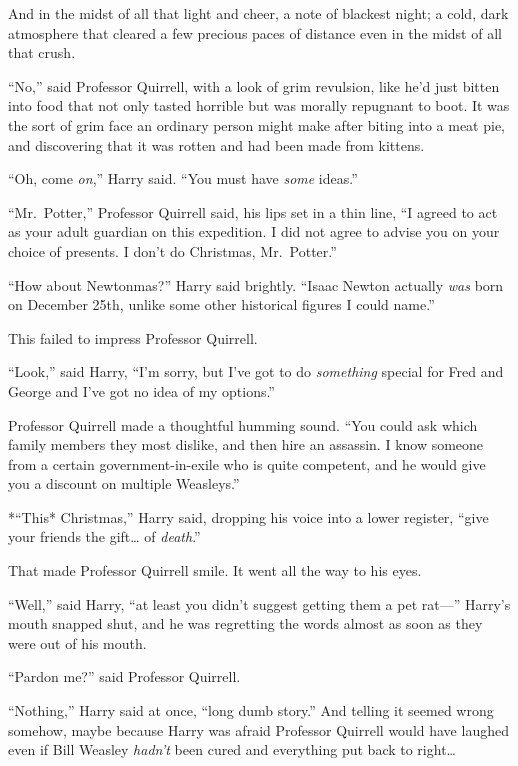 And in the midst of all that light and cheer, a note of blackest night;
a cold, dark atmosphere that cleared a few precious paces of distance
even in the midst of all that crush.

``No,'' said Professor Quirrell, with a look of grim revulsion, like
he'd just bitten into food that not only tasted horrible but was morally
repugnant to boot. It was the sort of grim face an ordinary person might
make after biting into a meat pie, and discovering that it was rotten
and had been made from kittens.

``Oh, come \emph{on},'' Harry said. ``You must have \emph{some} ideas.''

``Mr.~Potter,'' Professor Quirrell said, his lips set in a thin line,
``I agreed to act as your adult guardian on this expedition. I did not
agree to advise you on your choice of presents. I don't do Christmas,
Mr.~Potter.''

``How about Newtonmas?'' Harry said brightly. ``Isaac Newton actually
\emph{was} born on December 25th, unlike some other historical figures I
could name.''

This failed to impress Professor Quirrell.

``Look,'' said Harry, ``I'm sorry, but I've got to do \emph{something}
special for Fred and George and I've got no idea of my options.''

Professor Quirrell made a thoughtful humming sound. ``You could ask
which family members they most dislike, and then hire an assassin. I
know someone from a certain government-in-exile who is quite competent,
and he would give you a discount on multiple Weasleys.''

*``This* Christmas,'' Harry said, dropping his voice into a lower
register, ``give your friends the gift\ldots{} of \emph{death}.''

That made Professor Quirrell smile. It went all the way to his eyes.

``Well,'' said Harry, ``at least you didn't suggest getting them a pet
rat---'' Harry's mouth snapped shut, and he was regretting the words
almost as soon as they were out of his mouth.

``Pardon me?'' said Professor Quirrell.

``Nothing,'' Harry said at once, ``long dumb story.'' And telling it
seemed wrong somehow, maybe because Harry was afraid Professor Quirrell
would have laughed even if Bill Weasley \emph{hadn't} been cured and
everything put back to right\ldots{}

